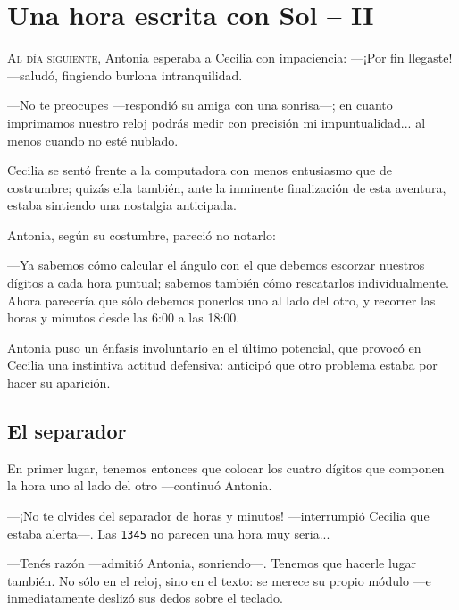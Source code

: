 \chapter{Una hora escrita con Sol -- II}

\vfill

\lettrine[lines=2]{A}{l día siguiente}, Antonia esperaba a Cecilia con
im\-pa\-cie\-ncia: ---¡Por fin llegaste! ---saludó, fingiendo burlona
intranquilidad.

---No te preocupes ---respondió su amiga con una son\-ri\-sa---; en
cuanto imprimamos nuestro reloj podrás medir con precisión mi
impuntualidad... al menos cuando no esté nublado.

Cecilia se sentó frente a la computadora con menos entusiasmo que de
costrumbre; quizás ella también, ante la inminente finalización de
esta aventura, estaba sintiendo una nostalgia anticipada.

Antonia, según su costumbre, pareció no notarlo:

---Ya sabemos cómo calcular el ángulo con el que debemos escorzar
nuestros dígitos a cada hora puntual; sabemos también cómo rescatarlos
individualmente. Ahora parecería que sólo debemos ponerlos uno al lado
del otro, y recorrer las horas y minutos desde las 6:00 a las 18:00.

Antonia puso un énfasis involuntario en el último potencial, que
provocó en Cecilia una instintiva actitud defensiva: anticipó que otro
problema estaba por hacer su aparición.

\section{El separador}

\guillemotright En primer lugar, tenemos entonces que colocar los
cuatro dígitos que componen la hora uno al lado del otro ---continuó
Antonia.

---¡No te olvides del separador de horas y minutos!  ---in\-terrumpió
Cecilia que estaba alerta---. Las \texttt{1345} no parecen una hora
muy seria...

---Tenés razón ---admitió Antonia, sonriendo---.  Tenemos que hacerle
lugar también. No sólo en el reloj, sino en el texto: se merece su
propio módulo ---e inmediatamente deslizó sus dedos sobre el teclado.

